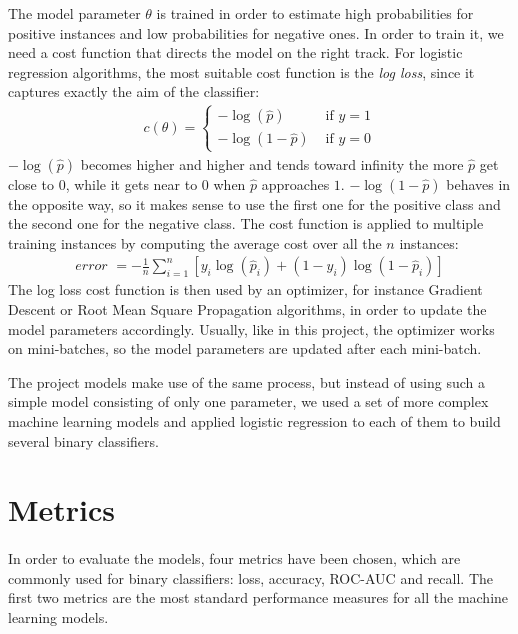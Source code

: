 The model parameter $\theta$ is trained in order to estimate high probabilities for positive instances and low probabilities for negative ones. In order to train it, we need a cost function that directs the model on the right track. For logistic regression algorithms, the most suitable cost function is the \textit{log loss}, since it captures exactly the aim of the classifier:
\begin{align}
    c(\theta) = \left\{\begin{array}{ll}{-\log (\hat{p})} & {\text { if } y=1} \\ {-\log (1-\hat{p})} & {\text { if } y=0}\end{array}\right.
\end{align}
$-\log (\hat{p})$ becomes higher and higher and tends toward infinity the more $\hat{p}$ get close to $0$, while it gets near to $0$ when $\hat{p}$ approaches $1$. $-\log (1-\hat{p})$ behaves in the opposite way, so it makes sense to use the first one for the positive class and the second one for the negative class. The cost function is applied to multiple training instances by computing the average cost over all the $n$ instances:
\begin{align}
    \textit{error } = -\frac{1}{n} \sum^{n}_{i=1}\left[y_i \log(\hat{p}_i) +
    (1 - y_i) \log(1 - \hat{p}_i)\right]
\end{align}
The log loss cost function is then used by an optimizer, for instance Gradient Descent or Root Mean Square Propagation algorithms, in order to update the model parameters accordingly. Usually, like in this project, the optimizer works on mini-batches, so the model parameters are updated after each mini-batch.

The project models make use of the same process, but instead of using such a simple model consisting of only one parameter, we used a set of more complex machine learning models and applied logistic regression to each of them to build several binary classifiers.


\section{Metrics} \label{sec: metrics}
\paragraph{} In order to evaluate the models, four metrics have been chosen, which are commonly used for binary classifiers: loss, accuracy, ROC-AUC and recall. The first two metrics are the most standard performance measures for all the machine learning models.

